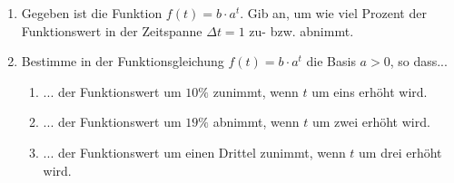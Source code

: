 \documentclass[11pt,oneside]{article}
\begin{document}
	\begin{aufgabe}
		\begin{enumerate}
			\item Gegeben ist die Funktion $f(t)=b\cdot a^t$. Gib an, um wie viel Prozent der Funktionswert in der Zeitspanne $\Delta t=1$ zu- bzw. abnimmt.
			\item Bestimme in der Funktionsgleichung $f(t)=b\cdot a^t$ die Basis $a>0$, so dass...
			\begin{enumerate}[label=\alph*)]
				\item ... der Funktionswert um $10\%$ zunimmt, wenn $t$ um eins erhöht wird.
				\item ... der Funktionswert um $19\%$ abnimmt, wenn $t$ um zwei erhöht wird.
				\item ... der Funktionswert um einen Drittel zunimmt, wenn $t$ um drei erhöht wird.
			\end{enumerate}
		\end{enumerate}
	\end{aufgabe}

\newpage
\end{document}
